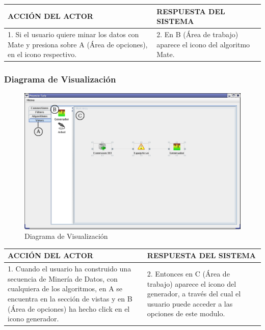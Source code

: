 \begin{center}
\begin{tabular}{|p{60mm}|p{60mm}|}\hline
ACCI\'ON DEL ACTOR & RESPUESTA DEL SISTEMA \\ \hline
1. Si el usuario quiere minar los datos con Mate y presiona sobre A (\'Area de opciones), en el icono respectivo.
& 2. En B (\'Area de trabajo) aparece el icono del algoritmo Mate. \\ \hline
\end{tabular}
\end{center}
\newpage

\subsubsection{Diagrama de Visualizaci\'on}
\begin{figure}[h]
 \centering
 \includegraphics[width=1\textwidth]{images/v01.png}
 \caption{Diagrama de Visualizaci\'on}
\end{figure}

\begin{center}
\begin{tabular}{|p{60mm}|p{60mm}|}\hline
ACCI\'ON DEL ACTOR & RESPUESTA DEL SISTEMA \\ \hline
1. Cuando el usuario ha construido una secuencia de Miner\'ia de Datos, con cualquiera de los algoritmos, en A se
encuentra en la secci\'on de vistas y en B (\'Area de opciones) ha hecho click en el icono generador.
& 2. Entonces en C (\'Area de trabajo) aparece el icono del generador, a trav\'es del cual el usuario puede acceder a las opciones de este modulo. \\ \hline
\end{tabular}
\end{center}
\newpage

